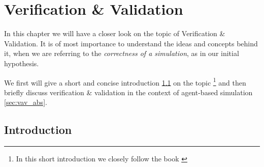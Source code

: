 \chapter{Verification \& Validation}
\label{chap:v_and_v}

In this chapter we will have a closer look on the topic of Verification \& Validation. It is of most importance to understand the ideas and concepts behind it, when we are referring to the \textit{correctness of a simulation}, as in our initial hypothesis. 

We first will give a short and concise introduction \ref{sec:vav_introduction} on the topic \footnote{In this short introduction we closely follow the book \cite{robinson_simulation:_2014}} and then briefly discuss verification \& validation in the context of agent-based simulation \ref{sec:vav_abs}.


\section{Introduction}
\label{sec:vav_introduction}
%
%

